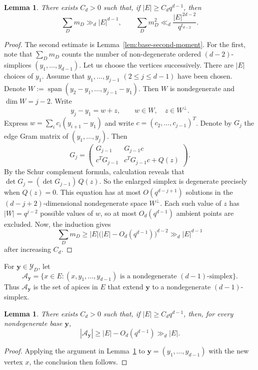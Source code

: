 \documentclass[11pt]{article}
\newtheorem{lemma}[theorem]{Lemma}
\theoremstyle{remark}
\numberwithin{equation}{section}
\newcommand{\cY}{\mathcal Y}
\newcommand{\cA}{\mathcal A}
\newcommand{\Span}{\operatorname{span}}
\newcommand{\1}{\mathbf 1}
\begin{document}
\begin{lemma}
\label{lem:base-number}
There exists \(C_d>0\) such that, if \(|E|\ge C_dq^{d-1}\), then
\[
\sum_Dm_D\gg_d |E|^{d-1},\qquad \sum_Dm_D^2 \ll_d \frac{|E|^{2d-2}}{q^{t_{d-2}}}.
\]
\end{lemma}

\begin{proof}
The second estimate is Lemma~\ref{lem:base-second-moment}. For the first, note that $\sum_D m_D$ counts the number of non-degenerate ordered $(d-2)$-simplices $(y_1,\ldots,y_{d-1})$. Let us choose the vertices successively. There are $|E|$ choices of $y_1$. Assume that $y_1,\ldots,y_{j-1}$ $(2\leq j\leq d-1)$ have been chosen. Denote $W:=\Span(y_2-y_1,\ldots,y_{j-1}-y_1)$. Then \(W\) is nondegenerate and \(\dim W=j-2\). Write
\[
y_j-y_1=w+z, \qquad w\in W, \quad z\in W^\perp.
\]
Express $w=\sum_i c_i (y_{i+1}-y_1)$ and write $c=(c_2, \ldots, c_{j-1})^T$. Denote by $G_j$ the edge Gram matrix of $(y_1,\ldots,y_j)$. Then 
\[
G_j=\begin{pmatrix}
G_{j-1} &G_{j-1}c\\
c^T G_{j-1} & c^TG_{j-1} c+Q(z)
\end{pmatrix}.
\]
By the Schur complement formula, calculation reveals that \(\det G_j=(\det G_{j-1})\,Q(z)\). So the enlarged simplex is degenerate precisely when $Q(z)= 0$. This equation has at most $O(q^{d-j+1})$ solutions in the $(d-j+2)$-dimensional nondegenerate space \(W^\perp\). Each such value of \(z\) has \(|W|=q^{j-2}\) possible values of \(w\), so at most \(O_d(q^{d-1})\) ambient points are excluded. Now, the induction gives
\[
 \sum_Dm_D
 \ge
 |E|\bigl(|E|-O_d(q^{d-1})\bigr)^{d-2}
 \gg_d |E|^{d-1}
\]
after increasing \(C_d\).
\end{proof}

For \(\mathbf y\in\cY_D\), let
\[
 \cA_{\mathbf y}
 =
 \{x\in E:
   (x,y_1,\ldots,y_{d-1})
   \text{ is a nondegenerate \((d-1)\)-simplex}\}.
\]
Thus \(\cA_{\mathbf y}\) is the set of apices in \(E\) that extend \(\mathbf y\) to a nondegenerate \((d-1)\)-simplex.

\begin{lemma}
\label{lem:admissible-apex}
There exists \(C_d>0\) such that, if \(|E|\ge C_dq^{d-1}\), then, for every nondegenerate base \(\mathbf y\),
\[
        |\cA_{\mathbf y}|
        \ge
        |E|-O_d(q^{d-1})
        \gg_d |E|.
\]
\end{lemma}

\begin{proof}
Applying the argument in Lemma~\ref{lem:base-number} to $\mathbf y=(y_1,\ldots,y_{d-1})$ with the new
vertex \(x\), the conclusion then follows.
\end{proof}
\end{document}
